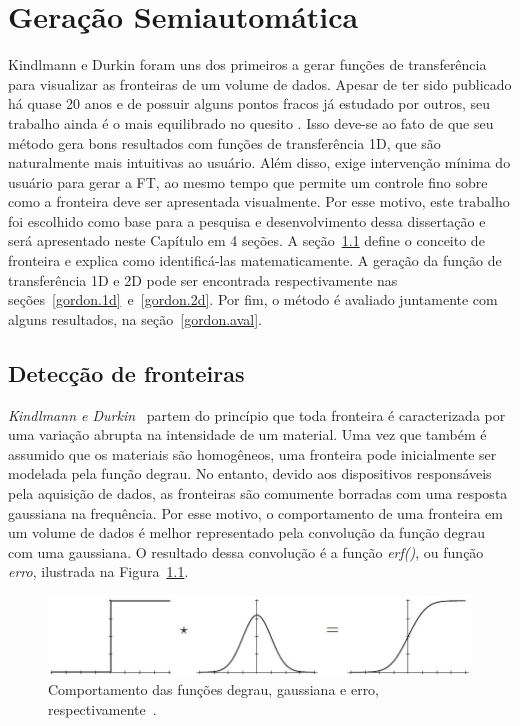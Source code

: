 
\chapter{Geração Semiautomática}
\label{gordon}

	Kindlmann e Durkin foram uns dos primeiros a gerar funções de transferência para visualizar as fronteiras de um volume de dados. Apesar de ter sido publicado há quase 20 anos e de possuir alguns pontos fracos já estudado por outros, seu trabalho ainda é o mais equilibrado no quesito . Isso deve-se ao fato de que seu método gera bons resultados com funções de transferência 1D, que são naturalmente mais intuitivas ao usuário. Além disso, exige intervenção mínima do usuário para gerar a FT, ao mesmo tempo que permite um controle fino sobre como a fronteira deve ser apresentada visualmente. Por esse motivo, este trabalho foi escolhido como base para a pesquisa e desenvolvimento dessa dissertação e será apresentado neste Capítulo em 4 seções. A seção~\ref{gordon.bound} define o conceito de fronteira e explica como identificá-las matematicamente. A geração da função de transferência 1D e 2D pode ser encontrada respectivamente nas seções~\ref{gordon.1d}~e~\ref{gordon.2d}. Por fim, o método é avaliado juntamente com alguns resultados, na seção~\ref{gordon.aval}.
	
\section{Detecção de fronteiras}
\label{gordon.bound}
	\textit{Kindlmann e Durkin}~\cite{gordon} partem do princípio que toda fronteira é caracterizada por uma variação abrupta na intensidade de um material. Uma vez que também é assumido que os materiais são homogêneos, uma fronteira pode inicialmente ser modelada pela função degrau. No entanto, devido aos dispositivos responsáveis pela aquisição de dados, as fronteiras são comumente borradas com uma resposta gaussiana na frequência. Por esse motivo, o comportamento de uma fronteira em um volume de dados é melhor representado pela convolução da função degrau com uma gaussiana. O resultado dessa convolução é a função \textit{erf()}, ou função \textit{erro}, ilustrada na Figura~\ref{fig:boundary_model}.
	
\begin{figure}[h]
	\centering
	\includegraphics[width=1\textwidth]{images/g_boundary_model}
	\caption{Comportamento das funções degrau, gaussiana e erro, respectivamente~\cite{gordon}.}
	\label{fig:boundary_model}
\end{figure}

